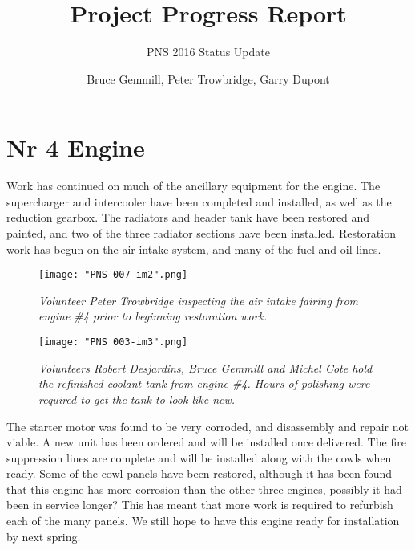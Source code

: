 %


\title{Project Progress Report}
\subtitle{PNS 2016 Status Update}
\author{Bruce Gemmill, Peter Trowbridge, Garry Dupont}

\maketitle

\section{Nr 4 Engine}
\label{sec:engine_4}

Work has continued on much of the ancillary equipment for the engine. The
supercharger and intercooler have been completed and installed, as well as the
reduction gearbox. The radiators and header tank have been restored and painted, and
two of the three radiator sections have been installed. Restoration work has
begun on the air intake system, and many of the fuel and oil lines. 

\begin{figure}[htbp]
   \vspace{2em}
   \centering
   \texttt{[image: "PNS 007-im2".png]}
   \caption*{\small \em Volunteer Peter Trowbridge inspecting the air intake fairing from engine \#4 prior to beginning restoration work.}
   \label{fig:engine_no_4_2}
\end{figure}

\begin{figure}[htbp]
   \vspace{2em}
   \centering
   \texttt{[image: "PNS 003-im3".png]}
   \caption*{\small \em Volunteers Robert Desjardins, Bruce Gemmill and Michel Cote hold the refinished coolant tank from engine \#4.  Hours of polishing were required to get the tank to look like new.}
   \label{fig:coolant_tank}
\end{figure}

The starter motor was found to be very corroded, and disassembly and repair not viable. A
new unit has been ordered and will be installed once delivered. The fire
suppression lines are complete and will be installed along with the cowls when
ready. Some of the cowl panels have been restored, although it has been found
that this engine has more corrosion than the other three engines, possibly it
had been in service longer? This has meant that more work is required to
refurbish each of the many panels. We still hope to have this engine ready for
installation by next spring. 

